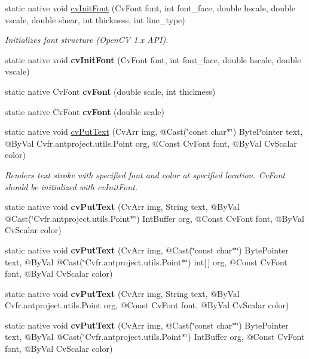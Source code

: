 \begin{DoxyCompactItemize}
\item 
static native void \hyperlink{group__imgproc__c_ga7802f35f4ff9683ba622d633d5b17a25}{cv\+Init\+Font} (Cv\+Font font, int font\+\_\+face, double hscale, double vscale, double shear, int thickness, int line\+\_\+type)
\begin{DoxyCompactList}\small\item\em Initializes font structure (Open\+CV 1.\+x A\+PI). \end{DoxyCompactList}\item 
static native void {\bfseries cv\+Init\+Font} (Cv\+Font font, int font\+\_\+face, double hscale, double vscale)
\item 
static native Cv\+Font {\bfseries cv\+Font} (double scale, int thickness)
\item 
static native Cv\+Font {\bfseries cv\+Font} (double scale)
\item 
static native void \hyperlink{group__imgproc__c_gaa0527c4e076b98ec48324b7585ca98df}{cv\+Put\+Text} (Cv\+Arr img, @Cast(\char`\"{}const char$\ast$\char`\"{}) Byte\+Pointer text, @By\+Val Cv\+fr.antproject.utils.Point org, @Const Cv\+Font font, @By\+Val Cv\+Scalar color)
\begin{DoxyCompactList}\small\item\em Renders text stroke with specified font and color at specified location. Cv\+Font should be initialized with cv\+Init\+Font. \end{DoxyCompactList}\item 
static native void {\bfseries cv\+Put\+Text} (Cv\+Arr img, String text, @By\+Val @Cast(\char`\"{}Cv\+fr.antproject.utils.Point$\ast$\char`\"{}) Int\+Buffer org, @Const Cv\+Font font, @By\+Val Cv\+Scalar color)
\item 
static native void {\bfseries cv\+Put\+Text} (Cv\+Arr img, @Cast(\char`\"{}const char$\ast$\char`\"{}) Byte\+Pointer text, @By\+Val @Cast(\char`\"{}Cv\+fr.antproject.utils.Point$\ast$\char`\"{}) int\mbox{[}$\,$\mbox{]} org, @Const Cv\+Font font, @By\+Val Cv\+Scalar color)
\item 
static native void {\bfseries cv\+Put\+Text} (Cv\+Arr img, String text, @By\+Val Cv\+fr.antproject.utils.Point org, @Const Cv\+Font font, @By\+Val Cv\+Scalar color)
\item 
static native void {\bfseries cv\+Put\+Text} (Cv\+Arr img, @Cast(\char`\"{}const char$\ast$\char`\"{}) Byte\+Pointer text, @By\+Val @Cast(\char`\"{}Cv\+fr.antproject.utils.Point$\ast$\char`\"{}) Int\+Buffer org, @Const Cv\+Font font, @By\+Val Cv\+Scalar color)
\item 

\end{DoxyCompactItemize}
